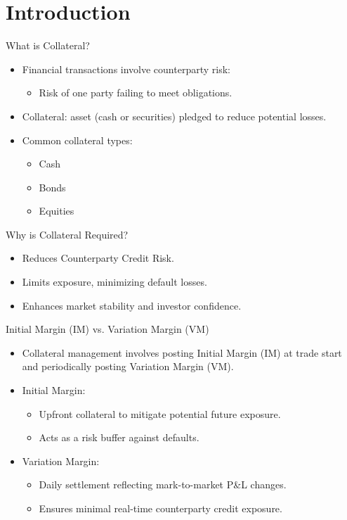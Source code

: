 \documentclass[handout, aspectratio=169]{beamer}
\subtitle{Collateral Management for Capital Markets Products}
\begin{document}


\section{Introduction}
\begin{frame}{What is Collateral?}
  \begin{itemize}
    \item Financial transactions involve counterparty risk:
    \begin{itemize}
      \item Risk of one party failing to meet obligations.
    \end{itemize}
    \item Collateral: asset (cash or securities) pledged to reduce potential losses.
    \item Common collateral types:
    \begin{itemize}
      \item Cash
      \item Bonds
      \item Equities
    \end{itemize} 
  \end{itemize}
\end{frame}

\begin{frame}{Why is Collateral Required?}
  \begin{itemize}
    \item Reduces Counterparty Credit Risk.
    \item Limits exposure, minimizing default losses.
    \item Enhances market stability and investor confidence.
  \end{itemize}
\end{frame}

\begin{frame}{Initial Margin (IM) vs. Variation Margin (VM)}
  \begin{itemize}
    \item Collateral management involves posting Initial Margin (IM) at trade start and periodically posting Variation Margin (VM).
  \end{itemize}
  \begin{itemize}
    \item Initial Margin:
    \begin{itemize}
      \item Upfront collateral to mitigate potential future exposure.
      \item Acts as a risk buffer against defaults.
    \end{itemize}
    \item Variation Margin:
    \begin{itemize}
      \item Daily settlement reflecting mark-to-market P\&L changes.
      \item Ensures minimal real-time counterparty credit exposure.
    \end{itemize}
  \end{itemize}
\end{frame}
\end{document}
